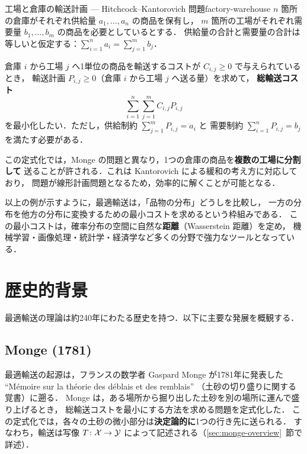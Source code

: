 \begin{example}{工場と倉庫の輸送計画 --- Hitchcock--Kantorovich 問題}{factory-warehouse}
  $n$ 箇所の倉庫がそれぞれ供給量 $a_1, \ldots, a_n$ の商品を保有し，
  $m$ 箇所の工場がそれぞれ需要量 $b_1, \ldots, b_m$ の商品を必要としているとする．
  供給量の合計と需要量の合計は等しいと仮定する：$\sum_{i=1}^n a_i = \sum_{j=1}^m b_j$．

  倉庫 $i$ から工場 $j$ へ1単位の商品を輸送するコストが $C_{i,j} \geq 0$ で与えられているとき，
  輸送計画 $P_{i,j} \geq 0$（倉庫 $i$ から工場 $j$ へ送る量）を求めて，
  \textbf{総輸送コスト}
  \[
    \sum_{i=1}^n \sum_{j=1}^m C_{i,j} P_{i,j}
  \]
  を最小化したい．ただし，供給制約 $\sum_{j=1}^m P_{i,j} = a_i$ と
  需要制約 $\sum_{i=1}^n P_{i,j} = b_j$ を満たす必要がある．

  この定式化では，Monge の問題と異なり，1つの倉庫の商品を\textbf{複数の工場に分割して}
  送ることが許される．これは Kantorovich による緩和の考え方に対応しており，
  問題が線形計画問題となるため，効率的に解くことが可能となる．
\end{example}

以上の例が示すように，最適輸送は，「品物の分布」どうしを比較し，
一方の分布を他方の分布に変換するための最小コストを求めるという枠組みである．
この最小コストは，確率分布の空間に自然な\textbf{距離}（Wasserstein 距離）を定め，
機械学習・画像処理・統計学・経済学など多くの分野で強力なツールとなっている．

\section{歴史的背景}
\label{sec:history}

最適輸送の理論は約240年にわたる歴史を持つ．以下に主要な発展を概観する．

\subsection*{Monge (1781)}

最適輸送の起源は，フランスの数学者 Gaspard Monge が1781年に発表した
``M\'{e}moire sur la th\'{e}orie des d\'{e}blais et des remblais''
（土砂の切り盛りに関する覚書）に遡る．
Monge は，ある場所から掘り出した土砂を別の場所に運んで盛り上げるとき，
総輸送コストを最小にする方法を求める問題を定式化した．
この定式化では，各々の土砂の微小部分は\textbf{決定論的に}1つの行き先に送られる．
すなわち，輸送は写像 $T\colon \mathcal{X} \to \mathcal{Y}$ によって記述される（\ref{sec:monge-overview}~節で詳述）．

